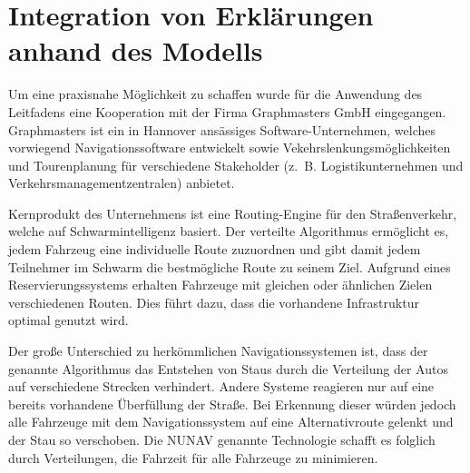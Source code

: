\section{Integration von Erklärungen anhand des Modells}

Um eine praxisnahe Möglichkeit zu schaffen wurde für die Anwendung des Leitfadens eine Kooperation mit der Firma Graphmasters GmbH eingegangen. Graphmasters ist ein in Hannover ansässiges Software-Unternehmen, welches vorwiegend Navigationssoftware entwickelt sowie Vekehrslenkungsmöglichkeiten und Tourenplanung für verschiedene Stakeholder (z.~B. Logistikunternehmen und Verkehrsmanagementzentralen) anbietet. 

Kernprodukt des Unternehmens ist eine Routing-Engine für den Straßenverkehr, welche auf Schwarmintelligenz basiert. Der verteilte Algorithmus ermöglicht es, jedem Fahrzeug eine individuelle Route zuzuordnen und gibt damit jedem Teilnehmer im Schwarm die bestmögliche Route zu seinem Ziel. Aufgrund eines Reservierungssystems erhalten Fahrzeuge mit gleichen oder ähnlichen Zielen verschiedenen Routen. Dies führt dazu, dass die vorhandene Infrastruktur optimal genutzt wird.

Der große Unterschied zu herkömmlichen Navigationssystemen ist, dass der genannte Algorithmus das Entstehen von Staus durch die Verteilung der Autos auf verschiedene Strecken verhindert. Andere Systeme reagieren nur auf eine bereits vorhandene Überfüllung der Straße. Bei Erkennung dieser würden jedoch alle Fahrzeuge mit dem Navigationssystem auf eine Alternativroute gelenkt und der Stau so verschoben. Die \glqq NUNAV\grqq{} genannte Technologie schaﬀt es folglich durch Verteilungen, die Fahrzeit für alle Fahrzeuge zu minimieren.











